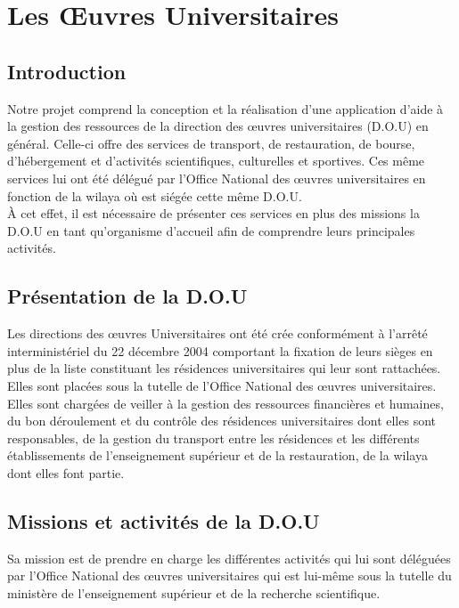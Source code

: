 \chapter{Les Œuvres Universitaires}

\section{Introduction}
    Notre projet comprend la conception et la réalisation d'une application d'aide à la gestion des ressources de la direction des œuvres universitaires (D.O.U) en général. Celle-ci offre des services de transport, de restauration, de bourse, d'hébergement et d'activités scientifiques, culturelles et sportives. Ces même services lui ont été délégué par l'Office National des œuvres universitaires en fonction de la wilaya où est siégée cette même \acs{D.O.U}.\\
    
    À cet effet, il est nécessaire de présenter ces services en plus des missions la \acs{D.O.U} en tant qu'organisme d'accueil afin de comprendre leurs principales activités.\\

\section{Présentation de la \acs{D.O.U} \cite{dou}}
    Les directions des œuvres Universitaires ont été crée conformément à l'arrêté interministériel du 22 décembre 2004 comportant la fixation de leurs sièges en plus de la liste constituant les résidences universitaires qui leur sont rattachées. Elles sont placées sous la tutelle de l'Office National des œuvres universitaires.\\

    Elles sont chargées de veiller à la gestion des ressources financières et humaines, du bon déroulement et du contrôle des résidences universitaires dont elles sont responsables, de la gestion du transport entre les résidences et les différents établissements de l'enseignement supérieur et de la restauration, de la wilaya dont elles font partie.\\

\section{Missions et activités de la \acs{D.O.U} \cite{onou-arrete}}
    Sa mission est de prendre en charge les différentes activités qui lui sont déléguées par l'Office National des œuvres universitaires qui est lui-même sous la tutelle du ministère de l'enseignement supérieur et de la recherche scientifique.\\
    
